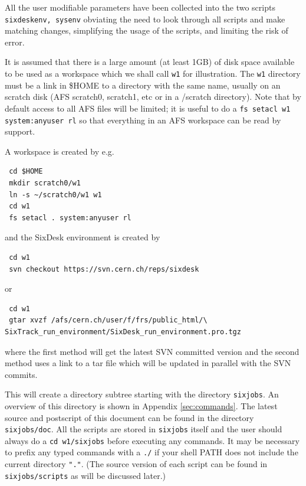 \documentclass{cernatsnote}    %
\begin{document}
All the user modifiable parameters have been collected 
into the two scripts {\tt sixdeskenv, sysenv} obviating the need to look through all
scripts and make matching changes, simplifying the usage of the scripts,
and limiting the risk of error.

It is assumed that there is a large amount (at least 1GB) of disk space
available to be used as a workspace which we shall call
{\tt w1} for illustration. The {\tt w1} directory must be a link in \$HOME
to a directory with the same name, usually on an scratch disk 
(AFS scratch0, scratch1, etc or in a /scratch directory).
Note that by default access to all AFS files will be limited; it is useful
to do a {\tt fs setacl w1 system:anyuser rl} so that everything in an
AFS workspace can be read by support.

A workspace is created by e.g. 
\begin{verbatim}
 cd $HOME
 mkdir scratch0/w1
 ln -s ~/scratch0/w1 w1 
 cd w1
 fs setacl . system:anyuser rl
\end{verbatim}
and the SixDesk environment is created by 
\begin{verbatim}
 cd w1
 svn checkout https://svn.cern.ch/reps/sixdesk
\end{verbatim}
or
\begin{verbatim}
 cd w1
 gtar xvzf /afs/cern.ch/user/f/frs/public_html/\
SixTrack_run_environment/SixDesk_run_environment.pro.tgz
\end{verbatim}
where the first method will get the latest SVN committed version
and the second method uses a link to a tar file which will be updated 
in parallel with the SVN commits.  

This will create a directory subtree starting with
the directory {\tt sixjobs}. An overview of this directory is
shown in Appendix \ref{sec:commands}. 
The latest source and postscript of this document can be found 
in the directory {\tt sixjobs/doc}.
All the scripts are stored in {\tt sixjobs} itself
and the user should always do a
{\tt cd w1/sixjobs} before executing any commands. It may be
necessary to prefix any typed commands with a {\tt ./} if your 
shell PATH does not include the current directory {\tt "."}. 
(The source version of each script can be found
in {\tt sixjobs/scripts} as will be discussed later.)
\end{document}
